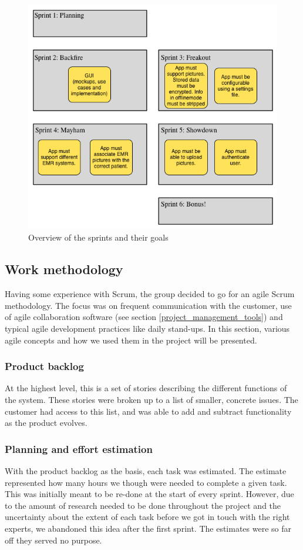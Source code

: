 \begin{figure}[H]
\centering
\includegraphics[scale=0.7]{img/sprint_overview.png}
\caption{Overview of the sprints and their goals}
\label{fig:sprinter_oversikt}
\end{figure}


\subsection{Work methodology}
Having some experience with Scrum, the group decided to go for an agile Scrum methodology. The focus was on frequent communication with the customer, use of agile collaboration software (see section \ref{project_management_tools}) and typical agile development practices like daily stand-ups. In this section, various agile concepts and how we used them in the project will be presented.


\subsubsection{Product backlog}
At the highest level, this is a set of stories describing the different functions of the system. These stories were broken up to a list of smaller, concrete issues. The customer had access to this list, and was able to add and subtract functionality as the product evolves.


\subsubsection{Planning and effort estimation}
With the product backlog as the basis, each task was estimated. The estimate represented how many hours we though were needed to complete a given task. This was initially meant to be re-done at the start of every sprint. However, due to the amount of research needed to be done throughout the project and the uncertainty about the extent of each task before we got in touch with the right experts, we abandoned this idea after the first sprint. The estimates were so far off they served no purpose.


